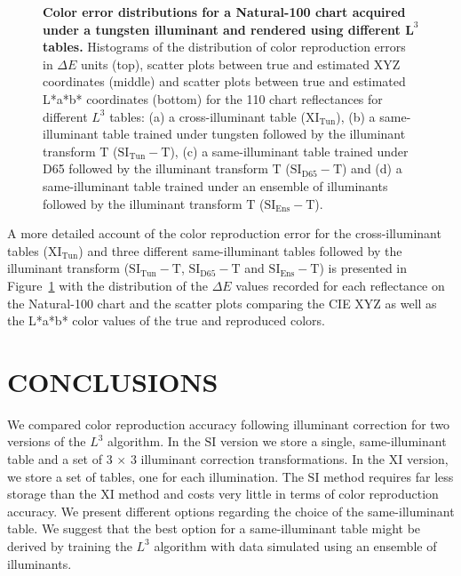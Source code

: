\documentclass[]{spie}
\newcommand{\Lcube}{L^3}
\newcommand{\XI}{\mathrm{XI}}
\newcommand{\SI}{\mathrm{SI}}
\newcommand{\XIT}{\mathrm{XI_{Tun}}}
\newcommand{\SITT}{\mathrm{SI_{Tun}-T}}
\newcommand{\SIDT}{\mathrm{SI_{D65}-T}}
\newcommand{\SIET}{\mathrm{SI_{Ens}-T}}
\newcommand{\TT}{\mathrm{T}}
\begin{document}
\begin{figure}[t]
\caption{\textbf{Color error distributions for a Natural-100 chart acquired under a tungsten illuminant and rendered using different $\boldsymbol\Lcube$ tables.} Histograms of the distribution of color reproduction errors in $\Delta E$ units (top), scatter plots between true and estimated XYZ coordinates (middle) and scatter plots between true and estimated L*a*b* coordinates (bottom) for the 110 chart reflectances for different $\Lcube$ tables: (a) a cross-illuminant table ($\XIT$), (b) a same-illuminant table trained under tungsten followed by the illuminant transform $\TT$ ($\SITT$), (c) a same-illuminant table trained under D65 followed by the illuminant transform $\TT$ ($\SIDT$) and (d) a same-illuminant table trained under an ensemble of illuminants followed by the illuminant transform $\TT$ ($\SIET$).}
\label{fig:colorStatisticsPlot}
\end{figure}

A more detailed account of the color reproduction error for the cross-illuminant tables ($\XIT$) and three different same-illuminant tables followed by the illuminant transform ($\SITT$, $\SIDT$ and $\SIET$) is presented in Figure~\ref{fig:colorStatisticsPlot} with the distribution of the $\Delta E$ values recorded for each reflectance on the Natural-100 chart and the scatter plots comparing the CIE XYZ as well as the L*a*b* color values of the true and reproduced colors.

\section{CONCLUSIONS}

We compared color reproduction accuracy following illuminant correction for two versions of the $\Lcube$ algorithm. In the $\SI$ version we store a single, same-illuminant table and a set of 3 $\times$ 3 illuminant correction transformations. In the $\XI$ version, we store a set of tables, one for each illumination. The $\SI$ method requires far less storage than the $\XI$ method and costs very little in terms of color reproduction accuracy. We present different options regarding the choice of the same-illuminant table. We suggest that the best option for a same-illuminant table might be derived by training the $\Lcube$ algorithm with data simulated using an ensemble of illuminants. 



\end{document}
